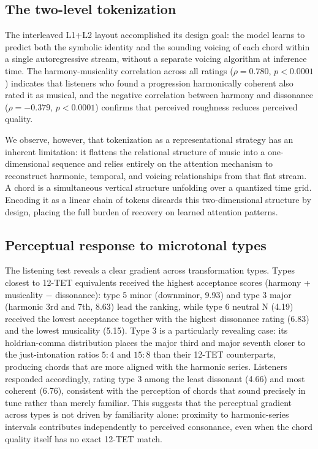 \documentclass{aimc2026}
\begin{document}
\subsection{The two-level tokenization}

The interleaved L1+L2 layout accomplished its design goal: the model learns to predict both the symbolic identity and the sounding voicing of each chord within a single autoregressive stream, without a separate voicing algorithm at inference time. The harmony-musicality correlation across all ratings ($\rho = 0.780$, $p < 0.0001$) indicates that listeners who found a progression harmonically coherent also rated it as musical, and the negative correlation between harmony and dissonance ($\rho = -0.379$, $p < 0.0001$) confirms that perceived roughness reduces perceived quality.

We observe, however, that tokenization as a representational strategy has an inherent limitation: it flattens the relational structure of music into a one-dimensional sequence and relies entirely on the attention mechanism to reconstruct harmonic, temporal, and voicing relationships from that flat stream. A chord is a simultaneous vertical structure unfolding over a quantized time grid. Encoding it as a linear chain of tokens discards this two-dimensional structure by design, placing the full burden of recovery on learned attention patterns.

\subsection{Perceptual response to microtonal types}

The listening test reveals a clear gradient across transformation types. Types closest to 12-TET equivalents received the highest acceptance scores (harmony + musicality $-$ dissonance): type 5 minor (downminor, 9.93) and type 3 major (harmonic 3rd and 7th, 8.63) lead the ranking, while type 6 neutral N (4.19) received the lowest acceptance together with the highest dissonance rating (6.83) and the lowest musicality (5.15). Type 3 is a particularly revealing case: its holdrian-comma distribution places the major third and major seventh closer to the just-intonation ratios $5{:}4$ and $15{:}8$ than their 12-TET counterparts, producing chords that are more aligned with the harmonic series. Listeners responded accordingly, rating type 3 among the least dissonant (4.66) and most coherent (6.76), consistent with the perception of chords that sound precisely in tune rather than merely familiar. This suggests that the perceptual gradient across types is not driven by familiarity alone: proximity to harmonic-series intervals contributes independently to perceived consonance, even when the chord quality itself has no exact 12-TET match.
\end{document}
